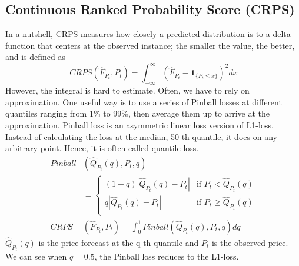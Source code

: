 \documentclass[11pt, letterpaper, journal]{IEEEtran}
\begin{document}
\subsection{Continuous Ranked Probability Score (CRPS)}
In a nutshell, CRPS measures how closely a predicted distribution is to a delta function that centers at the observed instance; the smaller the value, the better, and is defined as $$CRPS(\hat{F}_{P_t}, P_t) = \int_{-\infty}^{\infty} (\hat{F}_{P_t} - \mathbf{1}_{\{P_t \leq x\}})^2 dx$$ However, the integral is hard to estimate. Often, we have to rely on approximation. One useful way is to use a series of Pinball losses at different quantiles ranging from 1\% to 99\%, then average them up to arrive at the approximation. Pinball loss is an asymmetric linear loss version of L1-loss. Instead of calculating the loss at the median, 50-th quantile, it does on any arbitrary point. Hence, it is often called quantile loss.
\begin{align*}
    Pinball&(\hat{Q}_{P_t}(q), P_t, q) \\&= \begin{cases}
        (1-q) |\hat{Q}_{P_t}(q) - P_t| & \text{if $P_t < \hat{Q}_{P_t}(q)$} \\
        q |\hat{Q}_{P_t}(q) - P_t| & \text{if $P_t \geq \hat{Q}_{P_t}(q)$} \\
    \end{cases} \\
    CRPS&(\hat{F}_{P_t}, P_t) = \int_{0}^{1} Pinball(\hat{Q}_{P_t}(q), P_t, q) dq
\end{align*}
$\hat{Q}_{P_t}(q)$ is the price forecast at the q-th quantile and $P_t$ is the observed price. We can see when $q=0.5$, the Pinball loss reduces to the L1-loss.
\end{document}
